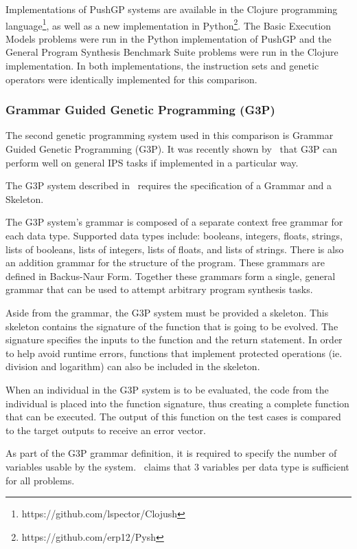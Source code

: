 Implementations of PushGP systems are available in the Clojure programming language\footnote{https://github.com/lspector/Clojush}, as well as a new implementation in Python\footnote{https://github.com/erp12/Pysh}. The Basic Execution Models problems were run in the Python implementation of PushGP and the General Program Synthesis Benchmark Suite problems were run in the Clojure implementation. In both implementations, the instruction sets and genetic operators were identically implemented for this comparison.

\subsubsection{Grammar Guided Genetic Programming (G3P)}

The second genetic programming system used in this comparison is Grammar Guided Genetic Programming (G3P). It was recently shown by~\cite{Forstenlechner:2017:eurogp} that G3P can perform well on general IPS tasks if implemented in a particular way.

The G3P system described in~\cite{Forstenlechner:2017:eurogp} requires the specification of a Grammar and a Skeleton. 

The G3P system's grammar is composed of a separate context free grammar for each data type. Supported data types include: booleans, integers, floats, strings, lists of booleans, lists of integers, lists of floats, and lists of strings. There is also an addition grammar for the structure of the program.  These grammars are defined in Backus-Naur Form. Together these grammars form a single, general grammar that can be used to attempt arbitrary program synthesis tasks.

Aside from the grammar, the G3P system must be provided a skeleton. This skeleton contains the signature of the function that is going to be evolved. The signature specifies the inputs to the function and the return statement. In order to help avoid runtime errors, functions that implement protected operations (ie. division and logarithm) can also be included in the skeleton.

When an individual in the G3P system is to be evaluated, the code from the individual is placed into the function signature, thus creating a complete function that can be executed. The output of this function on the test cases is compared to the target outputs to receive an error vector.

As part of the G3P grammar definition, it is required to specify the number of variables usable by the system.~\cite{Forstenlechner:2017:eurogp} claims that 3 variables per data type is sufficient for all problems.

